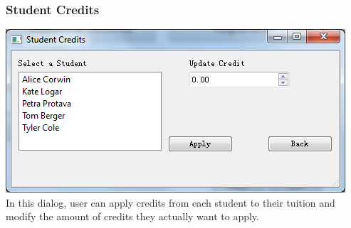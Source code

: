 \subsubsection{Student Credits}
\includegraphics[scale=0.5]{pics/student_credits.png}\\
In this dialog, user can apply credits from each student to their tuition and modify the amount of credits they actually want to apply.


